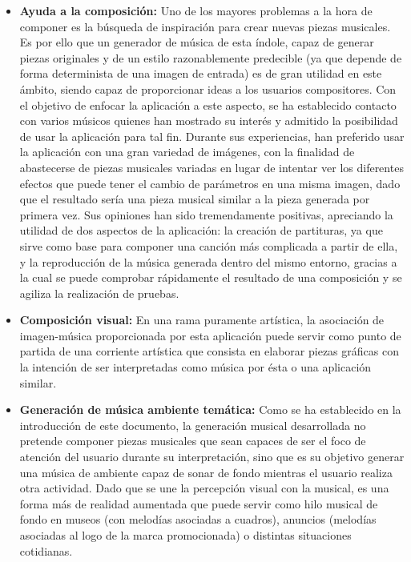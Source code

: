 \begin{itemize} 

\item\textbf{Ayuda a la composición:} Uno de los mayores problemas a la hora de componer es la búsqueda de inspiración para crear nuevas piezas musicales. Es por ello que un generador de música de esta índole, capaz de generar piezas originales y de un estilo razonablemente predecible (ya que depende de forma determinista de una imagen de entrada) es de gran utilidad en  este ámbito, siendo capaz de proporcionar ideas a los usuarios compositores. Con el objetivo de enfocar la aplicación a este aspecto, se ha establecido contacto con varios músicos quienes han mostrado su interés y admitido la posibilidad de usar la aplicación para tal fin. \color{blue} Durante sus experiencias, han preferido usar la aplicación con una gran variedad de imágenes, con la finalidad de abastecerse de piezas musicales variadas en lugar de intentar ver los diferentes efectos que puede tener el cambio de parámetros en una misma imagen, dado que el resultado sería una pieza musical similar a la pieza generada por primera vez. Sus opiniones han sido tremendamente positivas, apreciando la utilidad de dos aspectos de la aplicación: la creación de partituras, ya que sirve como base para componer una canción más complicada a partir de ella, y la reproducción de la música generada dentro del mismo entorno, gracias a la cual se puede comprobar rápidamente el resultado de una composición y se agiliza la realización de pruebas.\color{black}

\item\textbf{Composición visual:} \color{blue} En una rama puramente artística, la asociación de imagen-música proporcionada por esta aplicación puede servir como punto de partida de una corriente artística que consista en elaborar piezas gráficas con la intención de ser interpretadas como música por ésta o una aplicación similar.\color{black}


\item\textbf{Generación de música ambiente temática:} Como se ha establecido en la introducción de este documento, la generación musical desarrollada no pretende componer piezas musicales que sean capaces de ser el foco de atención del usuario durante su interpretación, sino que es su objetivo generar una música de ambiente capaz de sonar de fondo mientras el usuario realiza otra actividad. Dado que se une la percepción visual con la musical, es una forma más de realidad aumentada que puede servir como hilo musical de fondo en museos (con melodías asociadas a cuadros), anuncios (melodías asociadas al logo de la marca promocionada) o distintas situaciones cotidianas.


\end{itemize}
